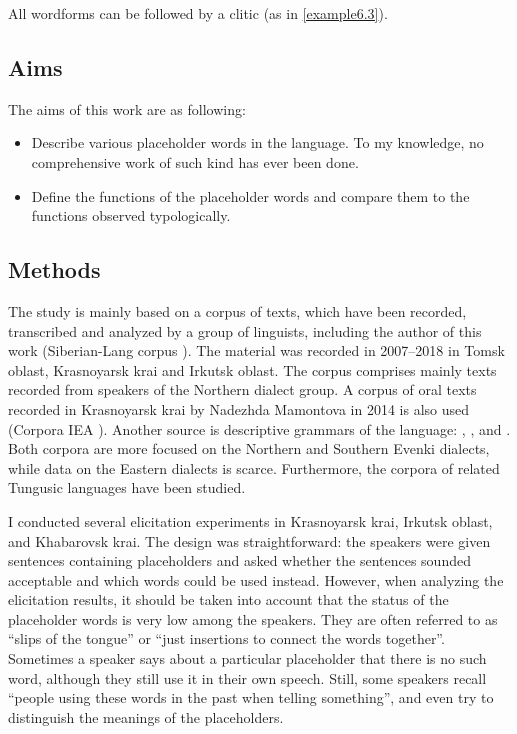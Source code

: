 \documentclass[output=paper,colorlinks,citecolor=brown]{langscibook}
\begin{document}
All wordforms can be followed by a clitic (as in \ref{example6.3}).


\subsection{Aims}

The aims of this work are as following:

\begin{itemize}
  \item Describe various placeholder words in the  language. To my knowledge, no comprehensive work of such kind has ever been done.
  \item Define the functions of the placeholder words and compare them to the functions observed typologically.
\end{itemize}

\subsection{Methods}

The study is mainly based on a corpus of texts, which have been recorded, transcribed and analyzed by a group of linguists, including the author of this work (Siberian-Lang corpus \citeyear{Corpus2019}). The material was recorded in 2007–2018 in Tomsk oblast, Krasnoyarsk krai and Irkutsk oblast. The corpus comprises mainly texts recorded from speakers of the Northern dialect group. A corpus of oral  texts recorded in Krasnoyarsk krai by Nadezhda Mamontova in 2014 is also used (Corpora IEA \citeyear{Corpora2019}). Another source is descriptive grammars of the  language: \citet{Konstantinova1964}, \citet{Nedjalkov1997}, and \citet{BulatovaGrenoble1999}. Both corpora are more focused on the Northern and Southern Evenki dialects, while data on the Eastern dialects is scarce. Furthermore, the corpora of related Tungusic languages have been studied.

I conducted several elicitation experiments in Krasnoyarsk krai, Irkutsk oblast, and Khabarovsk krai. The design was straightforward: the speakers were given sentences containing placeholders and asked whether the sentences sounded acceptable and which words could be used instead. However, when analyzing the elicitation results, it should be taken into account that the status of the placeholder words is very low among the speakers. They are often referred to as “slips of the tongue” or “just insertions to connect the words together”. Sometimes a speaker says about a particular placeholder that there is no such word, although they still use it in their own speech. Still, some speakers recall “people using these words in the past when telling something”, and even try to distinguish the meanings of the placeholders.
\end{document}
